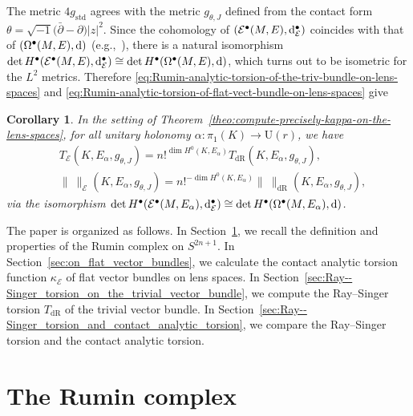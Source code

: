 \documentclass[10pt,a4paper]{amsart}
\numberwithin{equation}{section}
\newtheorem{Corollary}[Theorem]{Corollary}
\newcommand{\deRham}{\mathrm{dR}}
\newcommand{\RN}{\cE}
\newcommand{\cE}{\mathcal{E}}
\begin{document}
The metric $4 g_{\mathrm{std}}$ agrees with the metric $g_{\theta , J}$ defined from the contact form $\theta = \sqrt{-1} \big(\bar{\partial} - \partial\big) |z|^2$.
Since the cohomology of $(\cE ^\bullet (M,E) , {\rm d}_\RN ^\bullet)$
coincides with that of $ (\Omega^\bullet (M,E) , {\rm d} )$ (e.g.,~\cite[p.~286]{Rumin-94}), there is a natural isomorphism
$\det H^\bullet (\cE ^\bullet (M,E) , {\rm d}_\RN ^\bullet)
\cong
\det H^\bullet (\Omega^\bullet (M,E) , {\rm d} )
$, which turns out to be isometric for the $L^2$ metrics.
Therefore \eqref{eq:Rumin-analytic-torsion-of-the-triv-bundle-on-lens-spaces} and
\eqref{eq:Rumin-analytic-torsion-of-flat-vect-bundle-on-lens-spaces} give
\begin{Corollary}
\label{cor:Rumin-and-Ray--Singer-analytic-torsion-on-lens-spaces}
In the setting of Theorem~{\rm \ref{theo:compute-precisely-kappa-on-the-lens-spaces}},
for all unitary holonomy $\alpha \colon \pi_{1}(K) \to \mathrm{U} (r)$,
we have
\begin{align*}
& T_{\RN} ( K, E_{\alpha} , g_{\theta , J})
 =
 n!^{\dim H^0 ( K , E_{\alpha}) }
 T_{\deRham} ( K, E_{\alpha} , g_{\theta , J})
 ,
 \\
& \| \ \|_\RN ( K, E_{\alpha} , g_{\theta , J})
=
 n!^{- \dim H^0 ( K , E_{\alpha}) }
 \| \ \|_{\deRham} ( K, E_{\alpha} , g_{\theta , J})
 ,
\end{align*}
via the isomorphism $\det H^\bullet (\cE ^\bullet (M,E_{\alpha} ) , {\rm d}_\RN ^\bullet)
\cong\det H^\bullet (\Omega^\bullet (M,E_{\alpha}) , {\rm d} )$.
\end{Corollary}

The paper is organized as follows.
In Section~\ref{sec: The Rumin complex on the spheres},
we recall the definition and properties of the Rumin complex on $S^{2n+1}$.
In Section~\ref{sec:on_flat_vector_bundles},
we calculate the contact analytic torsion function $\kappa_\RN $ of flat vector bundles on lens spaces.
In Section~\ref{sec:Ray--Singer_torsion_on_the_trivial_vector_bundle},
we compute the Ray--Singer torsion $T_{\deRham} $ of the trivial vector bundle.
In Section~\ref{sec:Ray--Singer_torsion_and_contact_analytic_torsion},
we compare the Ray--Singer torsion and the contact analytic torsion.






\section{The Rumin complex}
\label{sec: The Rumin complex on the spheres}
\end{document}
